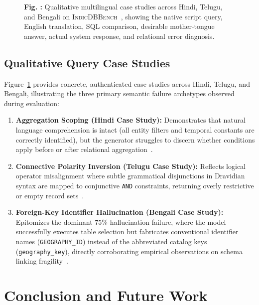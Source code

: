 \documentclass[conference]{IEEEtran}
\begin{document}
\begin{figure}[t]
\begin{tabular}{|p{}|}
\hline
\end{tabular}
\vspace{4pt}
\label{fig:case_studies}
\begin{flushleft}
\small\textbf{Fig. \thefigure:} Qualitative multilingual case studies across Hindi, Telugu, and Bengali on \textsc{IndicDBBench}~\cite{dawar2026indicdbbench}, showing the native script query, English translation, SQL comparison, desirable mother-tongue answer, actual system response, and relational error diagnosis.
\end{flushleft}
\end{figure}

\subsection{Qualitative Query Case Studies}
Figure~\ref{fig:case_studies} provides concrete, authenticated case studies across Hindi, Telugu, and Bengali, illustrating the three primary semantic failure archetypes observed during evaluation:
\begin{enumerate}
    \item \textbf{Aggregation Scoping (Hindi Case Study):} Demonstrates that natural language comprehension is intact (all entity filters and temporal constants are correctly identified), but the generator struggles to discern whether conditions apply before or after relational aggregation~\cite{yu2018spider,pourreza2023dinsql}.
    \item \textbf{Connective Polarity Inversion (Telugu Case Study):} Reflects logical operator misalignment where subtle grammatical disjunctions in Dravidian syntax are mapped to conjunctive \texttt{AND} constraints, returning overly restrictive or empty record sets~\cite{dou2022multispider}.
    \item \textbf{Foreign-Key Identifier Hallucination (Bengali Case Study):} Epitomizes the dominant 75\% hallucination failure, where the model successfully executes table selection but fabricates conventional identifier names (\texttt{GEOGRAPHY\_ID}) instead of the abbreviated catalog keys (\texttt{geography\_key}), directly corroborating empirical observations on schema linking fragility~\cite{li2020ratsql,gao2023gpt4}.
\end{enumerate}

\section{Conclusion and Future Work}\label{sec:conclusion}
\end{document}

